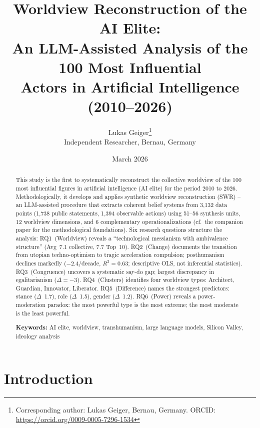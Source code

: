 \documentclass[12pt,a4paper]{article}
\title{%
  \sffamily\bfseries
  Worldview Reconstruction of the AI Elite:\\[0.3em]
  \large An LLM-Assisted Analysis of the 100 Most Influential\\
  Actors in Artificial Intelligence (2010--2026)%
}
\author{%
  Lukas Geiger\thanks{Corresponding author: Lukas Geiger, Bernau, Germany. ORCID: \url{https://orcid.org/0009-0005-7296-1534}}\\[0.3em]
  \small Independent Researcher, Bernau, Germany
}
\date{March 2026}
\begin{document}


\maketitle
\thispagestyle{empty}

\begin{abstract}
\noindent
This study is the first to systematically reconstruct the collective worldview of the 100 most influential figures in artificial intelligence (AI elite) for the period 2010 to 2026. Methodologically, it develops and applies synthetic worldview reconstruction (SWR) -- an LLM-assisted procedure that extracts coherent belief systems from 3,132 data points (1,738 public statements, 1,394 observable actions) using 51--56 synthesis units, 12 worldview dimensions, and 6 complementary operationalizations (cf.\ the companion paper \citealt{Geiger2026SWR} for the methodological foundations). Six research questions structure the analysis: RQ1~(Worldview) reveals a ``technological messianism with ambivalence structure'' (Avg~7.1 collective, 7.7 Top~10). RQ2~(Change) documents the transition from utopian techno-optimism to tragic acceleration compulsion; posthumanism declines markedly ($-2.4$/decade, $R^2 = 0.63$; descriptive OLS, not inferential statistics). RQ3~(Congruence) uncovers a systematic say-do gap; largest discrepancy in egalitarianism ($\Delta = -3$). RQ4~(Clusters) identifies four worldview types: Architect, Guardian, Innovator, Liberator. RQ5~(Difference) names the strongest predictors: stance ($\Delta$~1.7), role ($\Delta$~1.5), gender ($\Delta$~1.2). RQ6~(Power) reveals a power-moderation paradox: the most powerful type is the most extreme; the most moderate is the least powerful.

\medskip
\noindent\textbf{Keywords:} AI elite, worldview, transhumanism, large language models, Silicon Valley, ideology analysis
\end{abstract}

\newpage
\setcounter{page}{1}

\section{Introduction}
\label{sec:einleitung}
\end{document}
